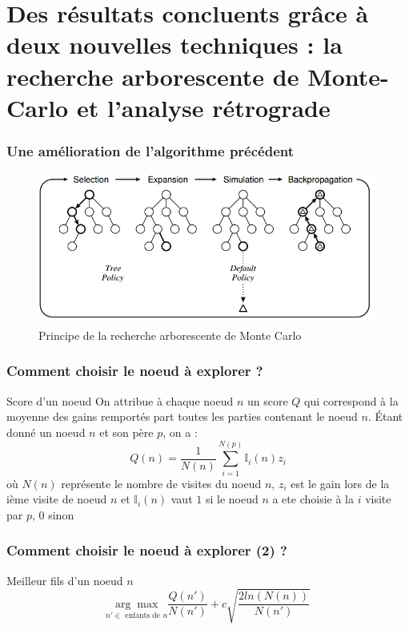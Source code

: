 \documentclass{beamer}
\begin{document}
\section{Des résultats concluents grâce à deux nouvelles techniques : la recherche arborescente de Monte-Carlo et l'analyse rétrograde}
\begin{frame}
  \frametitle{Une amélioration de l'algorithme précédent}
  \begin{figure}
    \centering
    \includegraphics[width=\linewidth]{ressources/monte_carlo_explication.png}
    \caption{Principe de la recherche arborescente de Monte Carlo}
  \end{figure}
\end{frame}

\begin{frame}
  \frametitle{Comment choisir le noeud à explorer ?}
  \begin{block}{Score d'un noeud}
On attribue à chaque noeud $n$ un score $Q$ qui correspond à la moyenne des gains remportés part toutes les parties contenant le noeud $n$. Étant donné un noeud $n$ et son père $p$, on a :
$$ Q(n) = \frac 1 {N(n)} \sum_{i=1}^{N(p)}\mathbb I_i(n)z_i $$
où $N(n)$ représente le nombre de visites du noeud $n$, $z_i$ est le gain lors de la ième visite de noeud $n$ et $\mathbb I_i(n)$ vaut $1$ si le noeud $n$ a ete choisie à la $i$ visite par $p$, 0 sinon
  \end{block}
\end{frame}

\begin{frame}
  \frametitle{Comment choisir le noeud à explorer (2) ?}
  \begin{block}{Meilleur fils d'un noeud $n$}
    $$\underset{n' \in \text{ enfants de } n}{\arg\max} \frac {Q(n')} {N(n')} + c\sqrt{\frac {2ln(N(n))} {N(n')} }$$
  \end{block}
\end{frame}
\end{document}

